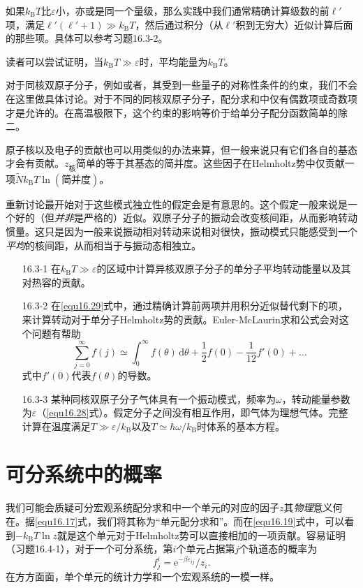 如果$k_\text{B}T$比$\varepsilon$小，亦或是同一个量级，那么实践中我们通常精确计算级数的前$\ell'$项，满足$\ell'(\ell'+1)\gg k_\text{B}T$，然后通过积分（从$\ell'$积到无穷大）近似计算后面的那些项。具体可以参考习题16.3-2。

读者可以尝试证明，当$k_\text{B}T\gg\varepsilon$时，平均能量为$k_\text{B}T$。

对于同核双原子分子，例如或者，其受到一些量子的对称性条件的约束，我们不会在这里做具体讨论。对于不同的同核双原子分子，配分求和中仅有偶数项或奇数项才是允许的。在高温极限下，这个约束的影响等价于给单分子配分函数简单的除二。

原子核以及电子的贡献也可以用类似的办法来算，但一般来说只有它们各自的基态才会有贡献。$z_\text{核}$简单的等于其基态的简并度。这些因子在Helmholtz势中仅贡献一项$\tilde Nk_\text{B}T\ln(\text{简并度})$。

重新讨论最开始对于这些模式独立性的假定会是有意思的。这个假定一般来说是一个好的（但{\it 并非}是严格的）近似。双原子分子的振动会改变核间距，从而影响转动惯量。这只是因为一般来说振动相对转动来说相对很快，振动模式只能感受到一个{\it 平均}的核间距，从而相当于与振动态相独立。

\begin{itemize}
\item[16.3-1] 在$k_\text{B}T\gg \varepsilon$的区域中计算异核双原子分子的单分子平均转动能量以及其对热容的贡献。
\item[16.3-2] 在\eqref{equ16.29}式中，通过精确计算前两项并用积分近似替代剩下的项，来计算转动对于单分子Helmholtz势的贡献。Euler-McLaurin求和公式会对这个问题有帮助
\begin{equation*}
\sum\limits_{j=0}^{\infty}f(j) \simeq \int_0^{\infty}f(\theta)\,\mathrm d\theta +\frac{1}{2}f(0)-\frac{1}{12}f'(0)+\dots
\end{equation*}
式中$f'(0)$代表$f(\theta)$的导数。
\item[16.3-3] 某种同核双原子分子气体具有一个振动模式，频率为$\omega$，转动能量参数为$\varepsilon$（\eqref{equ16.28}式）。假定分子之间没有相互作用，即气体为理想气体。完整计算在温度满足$T\gg \varepsilon/k_\text{B}$以及$T\simeq \hbar\omega/k_\text{B}$时体系的基本方程。
\end{itemize}

\section{可分系统中的概率}\label{sec16.4}
我们可能会质疑可分宏观系统配分求和中一个单元的对应的因子$z$其{\it 物理}意义何在。据\eqref{equ16.17}式，我们将其称为“单元配分求和”。而在\eqref{equ16.19}式中，可以看到$-k_\text{B}T\ln z$就是这个单元对于Helmholtz势可以直接相加的一项贡献。容易证明（习题16.4-1），对于一个可分系统，第$i$个单元占据第$j$个轨道态的概率为
\begin{equation}
f_j^i = \mathrm e^{-\beta\varepsilon_{ij}}/z_i.
\label{equ16.31}
\end{equation}
在方方面面，单个单元的统计力学和一个宏观系统的一模一样。

